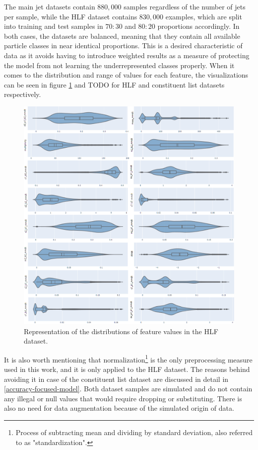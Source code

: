 The main jet datasets contain \(880,000\) samples regardless of the number of jets per sample, while the HLF dataset contains \(830,000\) examples, which are split into training and test samples in \(70:30\) and \(80:20\) proportions accordingly. In both cases, the datasets are balanced, meaning that they contain all available particle classes in near identical proportions. This is a desired characteristic of data as it avoids having to introduce weighted results as a measure of protecting the model from not learning the underrepresented classes properly. When it comes to the distribution and range of values for each feature, the visualizations can be seen in figure \ref{fig:distributions-hlf} and TODO for HLF and constituent list datasets respectively.

\begin{figure}[hpt!]
  \centering
  \includegraphics[trim={0cm 0cm 0cm 0cm}, width=1.0\textwidth, center]{background/distributions.png}
  \caption{Representation of the distributions of feature values in the HLF dataset.}
  \label{fig:distributions-hlf}
\end{figure}

It is also worth mentioning that normalization\footnote{Process of subtracting mean and dividing by standard deviation, also referred to as "standardization".} is the only preprocessing measure used in this work, and it is only applied to the HLF dataset. The reasons behind avoiding it in case of the constituent list dataset are discussed in detail in \cref{accuracy-focused-model}. Both dataset samples are simulated and do not contain any illegal or null values that would require dropping or substituting. There is also no need for data augmentation because of the simulated origin of data.

\todofig{|}
\todofig{|}
\todofig{|}
\todofig{|}
\todofig{|}
\todofig{|}
\todofig{|}
